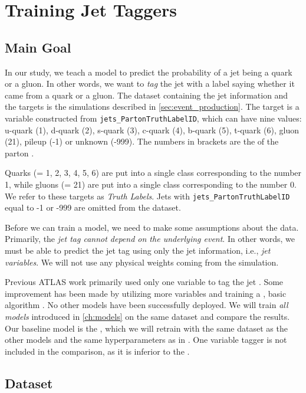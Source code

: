 \chapter{Training Jet Taggers}
\label{ch:training}
\section{Main Goal}
\label{sec:training_and_evaluation}
In our study, we teach a model to predict the probability of a jet being a quark or a gluon.
In other words, we want to \emph{tag} the jet with a label saying whether it came from a quark or a gluon.
The dataset containing the jet information and the targets is the \MC simulations described in \cref{sec:event_production}.
The target is a variable constructed from \texttt{jets\_PartonTruthLabelID}, which can have nine values: u-quark (1), d-quark (2), s-quark (3), c-quark (4), b-quark (5), t-quark (6), gluon (21), pileup (-1) or unknown (-999).
The numbers in brackets are the \PID of the parton \cite{pdg}.

Quarks (\PID = 1, 2, 3, 4, 5, 6) are put into a single class corresponding to the number 1, while gluons (\PID = 21) are put into a single class corresponding to the number 0.
We refer to these targets as \emph{Truth Labels}.
Jets with \texttt{jets\_PartonTruthLabelID} equal to -1 or -999 are omitted from the dataset.

Before we can train a model, we need to make some assumptions about the data.
Primarily, the \emph{jet tag cannot depend on the underlying event}.
In other words, we must be able to predict the jet tag using only the jet information, i.e., \emph{jet variables}.
We will not use any physical weights coming from the \MC simulation.

Previous ATLAS work primarily used only one variable to tag the jet \cite{ntrk_tag}.
Some improvement has been made by utilizing more variables and training a \bdt \cite{bdt_tag}, basic \ml algorithm \cite{bdt}.
No other models have been successfully deployed.
We will train \emph{all models} introduced in \cref{ch:models} on the same dataset and compare the results.
Our baseline model is the \bdt, which we will retrain with the same dataset as the other models and the same hyperparameters as in \cite{bdt_tag}.
One variable tagger is not included in the comparison, as it is inferior to the \bdt \cite{bdt_tag}.

\section{Dataset}
\label{sec:dataset}

